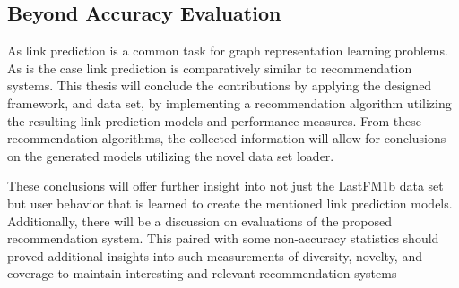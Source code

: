 \subsection{Beyond Accuracy Evaluation}

As link prediction is a common task for graph representation learning problems. As is the case link prediction is comparatively similar to recommendation systems. This thesis will conclude the contributions by applying the designed framework, and data set,  by implementing a  recommendation algorithm utilizing the resulting link prediction models and performance measures. From these recommendation algorithms, the collected information will allow for conclusions on the generated models utilizing the novel data set loader. 

These conclusions will offer further insight into not just the LastFM1b data set but user behavior that is learned to create the mentioned link prediction models. Additionally, there will be a discussion on evaluations of the proposed recommendation system. This paired with some non-accuracy statistics should proved additional insights into such measurements of diversity, novelty, and coverage to maintain interesting and relevant recommendation systems
